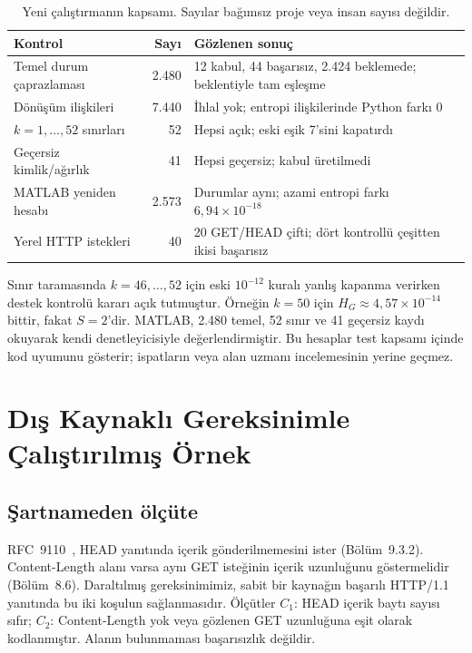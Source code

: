 \documentclass[runningheads]{llncs}
\begin{document}
\begin{table}[t]
\caption{Yeni çalıştırmanın kapsamı. Sayılar bağımsız proje veya insan sayısı değildir.}\label{tab:tests}
\centering\small\setlength{\tabcolsep}{4pt}
\begin{tabular}{p{}r p{}}
\toprule Kontrol & Sayı & Gözlenen sonuç\\\midrule
Temel durum çaprazlaması & 2.480 & 12 kabul, 44 başarısız, 2.424 beklemede; beklentiyle tam eşleşme\\
Dönüşüm ilişkileri & 7.440 & İhlal yok; entropi ilişkilerinde Python farkı 0\\
$k=1,\ldots,52$ sınırları & 52 & Hepsi açık; eski eşik 7'sini kapatırdı\\
Geçersiz kimlik/ağırlık & 41 & Hepsi geçersiz; kabul üretilmedi\\
MATLAB yeniden hesabı & 2.573 & Durumlar aynı; azami entropi farkı \mbox{$6{,}94\times10^{-18}$}\\
Yerel HTTP istekleri & 40 & 20 GET/HEAD çifti; dört kontrollü çeşitten ikisi başarısız\\\bottomrule
\end{tabular}
\end{table}

Sınır taramasında $k=46,\ldots,52$ için eski $10^{-12}$ kuralı yanlış kapanma verirken destek kontrolü kararı açık tutmuştur. Örneğin $k=50$ için $H_G\approx4{,}57\times10^{-14}$ bittir, fakat $S=2$'dir. MATLAB, 2.480 temel, 52 sınır ve 41 geçersiz kaydı okuyarak kendi denetleyicisiyle değerlendirmiştir. Bu hesaplar test kapsamı içinde kod uyumunu gösterir; ispatların veya alan uzmanı incelemesinin yerine geçmez.

\section{Dış Kaynaklı Gereksinimle Çalıştırılmış Örnek}
\subsection{Şartnameden ölçüte}
RFC~9110~\cite{rfc}, HEAD yanıtında içerik gönderilmemesini ister (Bölüm~9.3.2). Content-Length alanı varsa aynı GET isteğinin içerik uzunluğunu göstermelidir (Bölüm~8.6). Daraltılmış gereksinimimiz, sabit bir kaynağın başarılı HTTP/1.1 yanıtında bu iki koşulun sağlanmasıdır. Ölçütler $C_1$: HEAD içerik baytı sayısı sıfır; $C_2$: Content-Length yok veya gözlenen GET uzunluğuna eşit olarak kodlanmıştır. Alanın bulunmaması başarısızlık değildir.
\end{document}
